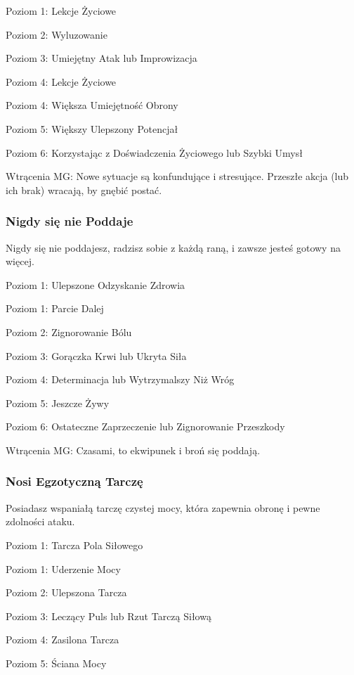 Poziom 1: Lekcje Życiowe

Poziom 2: Wyluzowanie

Poziom 3: Umiejętny Atak lub Improwizacja

Poziom 4: Lekcje Życiowe

Poziom 4: Większa Umiejętność Obrony

Poziom 5: Większy Ulepszony Potencjał

Poziom 6: Korzystając z Doświadczenia Życiowego lub Szybki Umysł

Wtrącenia MG: Nowe sytuacje są konfundujące i stresujące. Przeszłe akcja (lub ich brak) wracają, by gnębić postać. 

\subsubsection{Nigdy się nie Poddaje}

Nigdy się nie poddajesz, radzisz sobie z każdą raną, i zawsze jesteś gotowy na więcej.

Poziom 1: Ulepszone Odzyskanie Zdrowia

Poziom 1: Parcie Dalej

Poziom 2: Zignorowanie Bólu

Poziom 3: Gorączka Krwi lub Ukryta Siła

Poziom 4: Determinacja lub Wytrzymalszy Niż Wróg

Poziom 5: Jeszcze Żywy

Poziom 6: Ostateczne Zaprzeczenie lub Zignorowanie Przeszkody

Wtrącenia MG: Czasami, to ekwipunek i broń się poddają. 

\subsubsection{Nosi Egzotyczną Tarczę}

Posiadasz wspaniałą tarczę czystej mocy, która zapewnia obronę i pewne zdolności ataku.

Poziom 1: Tarcza Pola Siłowego

Poziom 1: Uderzenie Mocy

Poziom 2: Ulepszona Tarcza

Poziom 3: Leczący Puls lub Rzut Tarczą Siłową

Poziom 4: Zasilona Tarcza

Poziom 5: Ściana Mocy

